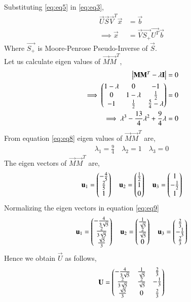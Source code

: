 \documentclass[journal,12pt,twocolumn]{IEEEtran}
\begin{document}
Substituting \eqref{eq:eq5} in \eqref{eq:eq3},
\begin{align}
\vec{U}\vec{S}\vec{V}^T\vec{x} & = \vec{b}\\
\implies\vec{x} &= \vec{V}\vec{S_+}\vec{U^T}\vec{b}\label{eq:eq7}
\end{align}
Where $\vec{S_+}$ is Moore-Penrose Pseudo-Inverse of $\vec{S}$. \\
Let us calculate eigen values of $\vec{M}\vec{M}^T$,
\begin{align}
\begin{vmatrix}\mathbf{M}\mathbf{M}^T - \lambda\mathbf{I}\end{vmatrix} &= 0\\
\implies\begin{pmatrix}1-\lambda&0&-1\\0&1-\lambda&\frac{1}{2}\\-1&\frac{1}{2}&\frac{5}{4}-\lambda\end{pmatrix} &=0\\
\implies\lambda^3-\frac{13}{4}\lambda^2+\frac{9}{4}\lambda &=0 \label{eq:eq8}
\end{align}
From equation \eqref{eq:eq8} eigen values of $\vec{M}\vec{M}^T$ are,
\begin{align}
\lambda_1 = \frac{9}{4} \quad
\lambda_2 = 1 \quad
\lambda_3 = 0
\end{align}
The eigen vectors of $\vec{M}\vec{M}^T$ are,
\begin{align}
\mathbf{u}_1=\begin{pmatrix}-\frac{4}{5}\\\frac{2}{5}\\1\end{pmatrix}\quad
\mathbf{u}_2=\begin{pmatrix}\frac{1}{2}\\1\\0\end{pmatrix}\quad
\mathbf{u}_3=\begin{pmatrix}1\\-\frac{1}{2}\\1\end{pmatrix}\label{eq:eq9}
\end{align}
Normalizing the eigen vectors in equation \eqref{eq:eq9}
\begin{align}
\mathbf{u}_1=\begin{pmatrix}-\frac{4}{3\sqrt{5}}\\\frac{2}{3\sqrt{5}}\\\frac{\sqrt{5}}{3}\end{pmatrix}\quad
\mathbf{u}_2=\begin{pmatrix}\frac{1}{\sqrt{5}}\\\frac{2}{\sqrt{5}}\\0\end{pmatrix}\quad
\mathbf{u}_3=\begin{pmatrix}\frac{2}{3}\\-\frac{1}{3}\\\frac{2}{3}\end{pmatrix}
\end{align}
Hence we obtain $\vec{U}$ as follows,
\begin{align}
\mathbf{U}=\begin{pmatrix}-\frac{4}{3\sqrt{5}}&\frac{1}{\sqrt{5}}&\frac{2}{3}\\\frac{2}{3\sqrt{5}}&\frac{2}{\sqrt{5}}&-\frac{1}{3}\\\frac{\sqrt{5}}{3}&0&\frac{2}{3}\end{pmatrix}\label{eq:eq10}
\end{align}
\end{document}
